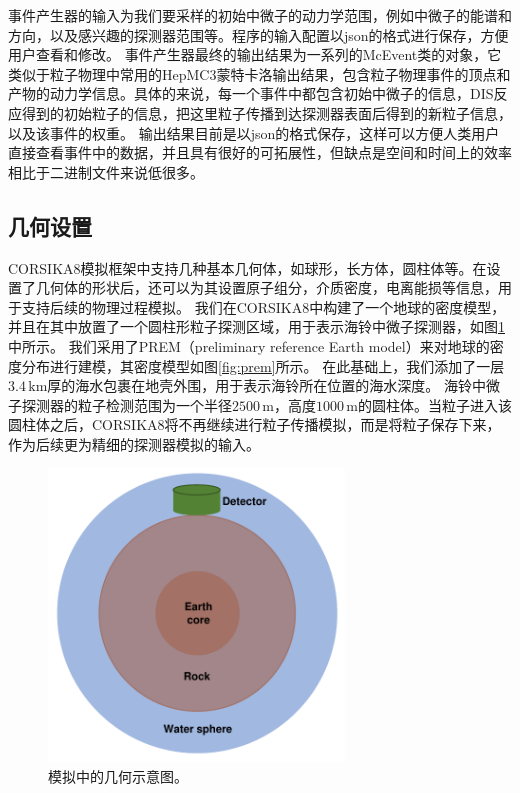 事件产生器的输入为我们要采样的初始中微子的动力学范围，例如中微子的能谱和方向，以及感兴趣的探测器范围等。程序的输入配置以\textsf{json}的格式进行保存，方便用户查看和修改。
事件产生器最终的输出结果为一系列的\textsf{McEvent}类的对象，它类似于粒子物理中常用的\textsf{HepMC3}蒙特卡洛输出结果\cite{HepMC3:2019}，包含粒子物理事件的顶点和产物的动力学信息。具体的来说，每一个事件中都包含初始中微子的信息，DIS反应得到的初始粒子的信息，把这里粒子传播到达探测器表面后得到的新粒子信息，以及该事件的权重。
输出结果目前是以\textsf{json}的格式保存，这样可以方便人类用户直接查看事件中的数据，并且具有很好的可拓展性，但缺点是空间和时间上的效率相比于二进制文件来说低很多。

\subsection{几何设置}

\textsf{CORSIKA8}模拟框架中支持几种基本几何体，如球形，长方体，圆柱体等。在设置了几何体的形状后，还可以为其设置原子组分，介质密度，电离能损等信息，用于支持后续的物理过程模拟。
我们在\textsf{CORSIKA8}中构建了一个地球的密度模型，并且在其中放置了一个圆柱形粒子探测区域，用于表示海铃中微子探测器，如图\ref{fig:corsika_geometry}中所示。
我们采用了PREM（preliminary reference Earth model）\cite{PREM:1981}来对地球的密度分布进行建模，其密度模型如图\ref{fig:prem}所示。
在此基础上，我们添加了一层$3.4\,\mathrm{km}$厚的海水包裹在地壳外围，用于表示海铃所在位置的海水深度。
海铃中微子探测器的粒子检测范围为一个半径$2500\,\mathrm{m}$，高度$1000\,\mathrm{m}$的圆柱体。当粒子进入该圆柱体之后，\textsf{CORSIKA8}将不再继续进行粒子传播模拟，而是将粒子保存下来，作为后续更为精细的探测器模拟的输入。

\begin{figure}[htb]
\centering
    \includegraphics[width=0.70\textwidth]{img/corsika_geometry.pdf}
    \caption{模拟中的几何示意图。}
    \label{fig:corsika_geometry}
\end{figure}

